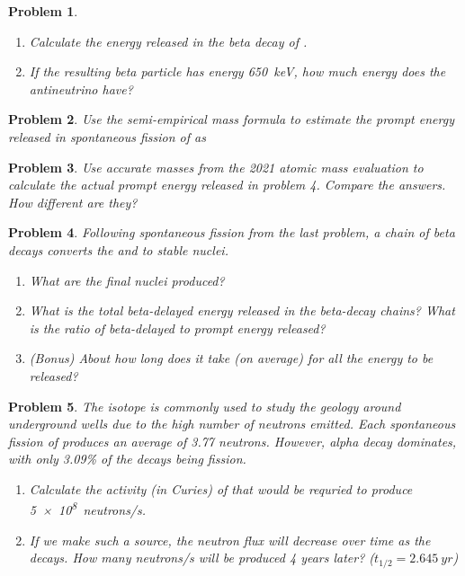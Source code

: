 \documentclass{article}
\newtheorem{plm}{Problem}
\begin{document}
\begin{plm}
  \;
  \begin{enumerate}
  \item Calculate the energy released in the beta decay of .
  \item If the resulting beta particle has energy \SI{650}{keV}, how much energy does the antineutrino have?
  \end{enumerate}
\end{plm}
\begin{plm}
  Use the semi-empirical mass formula to estimate the prompt energy released in spontaneous fission of  as
  \begin{center}
  \end{center}
\end{plm}
\begin{plm}
  Use \textit{accurate} masses from the 2021 atomic mass evaluation to calculate the actual prompt energy released in problem 4.
  Compare the answers.
  How different are they?
\end{plm}
\begin{plm}
  Following spontaneous fission from the last problem, a chain of beta decays converts the  and  to stable nuclei.
  \begin{enumerate}
  \item What are the final nuclei produced?
  \item What is the total beta-delayed energy released in the beta-decay chains?
    What is the ratio of beta-delayed to prompt energy released?
  \item (Bonus) About how long does it take (on average) for all the energy to be released?
  \end{enumerate}
\end{plm}
\begin{plm}
  The isotope  is commonly used to study the geology around underground wells due to the high number of neutrons emitted.
  Each spontaneous fission of  produces an average of 3.77 neutrons.
  However, alpha decay dominates, with only 3.09\% of the decays being fission.
  \begin{enumerate}
  \item Calculate the activity (in Curies) of  that would be requried to produce \SI{5e8}{neutrons/s}.
  \item If we make such a source, the neutron flux will decrease over time as the  decays.
    How many \si{neutrons/s} will be produced 4 years later? ($t_{1/2} = \SI{2.645}{yr}$)
  \end{enumerate}
\end{plm}
\end{document}
